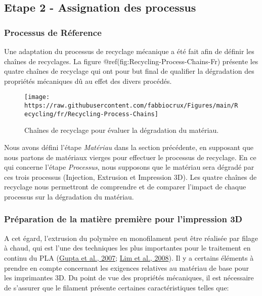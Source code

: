 \documentclass[
]{article}
\begin{document}
\hypertarget{etape-2---assignation-des-processus}{%
\subsection{Etape 2 - Assignation des
processus}\label{etape-2---assignation-des-processus}}

\hypertarget{processus-de-ruxe9ference}{%
\subsubsection{Processus de Réference}\label{processus-de-ruxe9ference}}

Une adaptation du processus de recyclage mécanique a été fait afin de
définir les chaînes de recyclages. La figure
@ref(fig:Recycling-Process-Chains-Fr) présente les quatre chaînes de
recyclage qui ont pour but final de qualifier la dégradation des
propriétés mécaniques dû au effet des divers procédés.

\begin{figure}

{\centering \texttt{[image: https://raw.githubusercontent.com/fabbiocrux/Figures/main/Recycling/fr/Recycling-Process-Chains]} 

}

\caption{Chaînes de recyclage pour évaluer la dégradation du matériau.}\label{fig:Recycling-Process-Chains-Fr}
\end{figure}

Nous avons défini l'étape \emph{Matériau} dans la section précédente, en
supposant que nous partons de matériaux vierges pour effectuer le
processus de recyclage. En ce qui concerne l'étape \emph{Processus},
nous supposons que le matériau sera dégradé par ces trois processus
(Injection, Extrusion et Impression 3D). Les quatre chaînes de recyclage
nous permettront de comprendre et de comparer l'impact de chaque
processus sur la dégradation du matériau.

\hypertarget{pruxe9paration-de-la-matiuxe8re-premiuxe8re-pour-limpression-3d}{%
\subsubsection{Préparation de la matière première pour l'impression
3D}\label{pruxe9paration-de-la-matiuxe8re-premiuxe8re-pour-limpression-3d}}

A cet égard, l'extrusion du polymère en monofilament peut être réalisée
par filage à chaud, qui est l'une des techniques les plus importantes
pour le traitement en continu du PLA
(\protect\hyperlink{ref-Gupta2007}{Gupta et al., 2007};
\protect\hyperlink{ref-Lim2008}{Lim et al., 2008}). Il y a certains
éléments à prendre en compte concernant les exigences relatives au
matériau de base pour les imprimantes 3D. Du point de vue des propriétés
mécaniques, il est nécessaire de s'assurer que le filament présente
certaines caractéristiques telles que:
\end{document}
